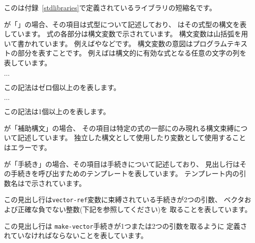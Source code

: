 このは付録~\ref{stdlibraries}で定義されているライブラリの短縮名です。

が「\exprtype」の場合、その項目は式型について記述しており、
はその式型の構文を表しています。
式の各部分は構文変数で示されています。
構文変数は山括弧を用いて書かれています。
例えばやなどです。
構文変数の意図はプログラムテキストの部分を表すことです。
例えばは構文的に有効な式となる任意の文字の列を表しています。
\begin{tabbing}
\qquad {} $\ldots$
\end{tabbing}
この記法はゼロ個以上のを表します。
\begin{tabbing}
\qquad {}  $\ldots$
\end{tabbing}
この記法は1個以上のを表します。

が「補助構文」の場合、
その項目は特定の式の一部にのみ現れる構文束縛について記述しています。
独立した構文として使用したり変数として使用することはエラーです。

が「手続き」の場合、その項目は手続きについて記述しており、
見出し行はその手続きを呼び出すためのテンプレートを表しています。
テンプレート内の引数名はで示されています。

\noindent{}\unpenalty

この見出し行は{\tt vector-ref}変数に束縛されている手続きが2つの引数、
ベクタおよび正確な負でない整数(下記を参照してください)を
取ることを表しています。

\noindent%
\unpenalty

この見出し行は
{\tt make-vector}手続きが1つまたは2つの引数を取るように
定義されていなければならないことを表しています。

